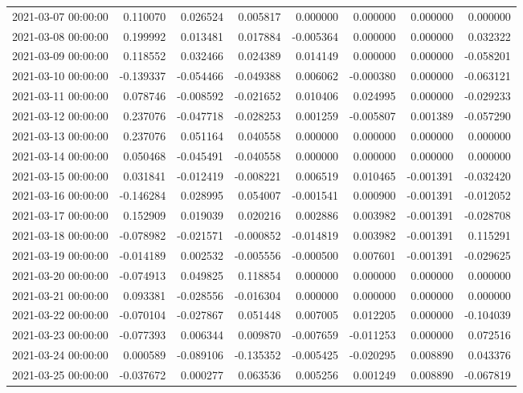 \begin{tabular}{lrrrrrrr}
2021-03-07 00:00:00 & 0.110070 & 0.026524 & 0.005817 & 0.000000 & 0.000000 & 0.000000 & 0.000000 \\
2021-03-08 00:00:00 & 0.199992 & 0.013481 & 0.017884 & -0.005364 & 0.000000 & 0.000000 & 0.032322 \\
2021-03-09 00:00:00 & 0.118552 & 0.032466 & 0.024389 & 0.014149 & 0.000000 & 0.000000 & -0.058201 \\
2021-03-10 00:00:00 & -0.139337 & -0.054466 & -0.049388 & 0.006062 & -0.000380 & 0.000000 & -0.063121 \\
2021-03-11 00:00:00 & 0.078746 & -0.008592 & -0.021652 & 0.010406 & 0.024995 & 0.000000 & -0.029233 \\
2021-03-12 00:00:00 & 0.237076 & -0.047718 & -0.028253 & 0.001259 & -0.005807 & 0.001389 & -0.057290 \\
2021-03-13 00:00:00 & 0.237076 & 0.051164 & 0.040558 & 0.000000 & 0.000000 & 0.000000 & 0.000000 \\
2021-03-14 00:00:00 & 0.050468 & -0.045491 & -0.040558 & 0.000000 & 0.000000 & 0.000000 & 0.000000 \\
2021-03-15 00:00:00 & 0.031841 & -0.012419 & -0.008221 & 0.006519 & 0.010465 & -0.001391 & -0.032420 \\
2021-03-16 00:00:00 & -0.146284 & 0.028995 & 0.054007 & -0.001541 & 0.000900 & -0.001391 & -0.012052 \\
2021-03-17 00:00:00 & 0.152909 & 0.019039 & 0.020216 & 0.002886 & 0.003982 & -0.001391 & -0.028708 \\
2021-03-18 00:00:00 & -0.078982 & -0.021571 & -0.000852 & -0.014819 & 0.003982 & -0.001391 & 0.115291 \\
2021-03-19 00:00:00 & -0.014189 & 0.002532 & -0.005556 & -0.000500 & 0.007601 & -0.001391 & -0.029625 \\
2021-03-20 00:00:00 & -0.074913 & 0.049825 & 0.118854 & 0.000000 & 0.000000 & 0.000000 & 0.000000 \\
2021-03-21 00:00:00 & 0.093381 & -0.028556 & -0.016304 & 0.000000 & 0.000000 & 0.000000 & 0.000000 \\
2021-03-22 00:00:00 & -0.070104 & -0.027867 & 0.051448 & 0.007005 & 0.012205 & 0.000000 & -0.104039 \\
2021-03-23 00:00:00 & -0.077393 & 0.006344 & 0.009870 & -0.007659 & -0.011253 & 0.000000 & 0.072516 \\
2021-03-24 00:00:00 & 0.000589 & -0.089106 & -0.135352 & -0.005425 & -0.020295 & 0.008890 & 0.043376 \\
2021-03-25 00:00:00 & -0.037672 & 0.000277 & 0.063536 & 0.005256 & 0.001249 & 0.008890 & -0.067819 \\

\end{tabular}
